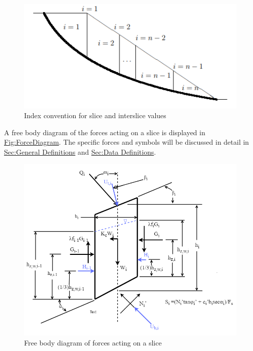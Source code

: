 \documentclass[12pt]{article}
\begin{document}
\begin{figure}
\begin{center}
\includegraphics[width=\textwidth]{../../../../datafiles/ssp/IndexConvention.png}
\caption{Index convention for slice and interslice values}
\label{Figure:IndexConvention}
\end{center}
\end{figure}
A free body diagram of the forces acting on a slice is displayed in \hyperref[Figure:ForceDiagram]{Fig:ForceDiagram}. The specific forces and symbols will be discussed in detail in \hyperref[Sec:GDs]{Sec:General Definitions} and \hyperref[Sec:DDs]{Sec:Data Definitions}.

\begin{figure}
\begin{center}
\includegraphics[width=\textwidth]{../../../../datafiles/ssp/ForceDiagram.png}
\caption{Free body diagram of forces acting on a slice}
\label{Figure:ForceDiagram}
\end{center}
\end{figure}
\end{document}
